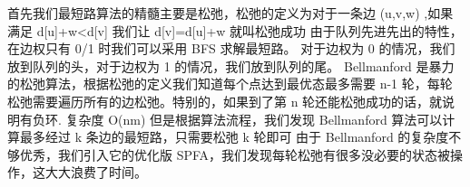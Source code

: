 {}\markdownRendererInterblockSeparator
{}
\markdownRendererSectionEnd \markdownRendererSectionBegin
{}\markdownRendererInterblockSeparator
{}\markdownRendererSectionBegin
{}\markdownRendererInterblockSeparator
{}首先我们最短路算法的精髓主要是松弛，松弛的定义为对于一条边\markdownRendererDollarSign{} (u,v,w) \markdownRendererDollarSign{},如果满足\markdownRendererDollarSign{} d[u]+w<d[v] \markdownRendererDollarSign{}\markdownRendererParagraphSeparator
{}我们让\markdownRendererDollarSign{} d[v]=d[u]+w \markdownRendererDollarSign{}就叫松弛成功\markdownRendererInterblockSeparator
{}\markdownRendererSectionBegin
{}\markdownRendererInterblockSeparator
{}由于队列先进先出的特性，在边权只有\markdownRendererDollarSign{} 0/1 \markdownRendererDollarSign{}时我们可以采用\markdownRendererDollarSign{} BFS \markdownRendererDollarSign{}求解最短路。\markdownRendererParagraphSeparator
{}对于边权为\markdownRendererDollarSign{} 0 \markdownRendererDollarSign{}的情况，我们放到队列的头，对于边权为\markdownRendererDollarSign{} 1 \markdownRendererDollarSign{}的情况，我们放到队列的尾。\markdownRendererInterblockSeparator
{}
\markdownRendererSectionEnd \markdownRendererSectionBegin
{}\markdownRendererInterblockSeparator
{}\markdownRendererDollarSign{} Bellmanford \markdownRendererDollarSign{}是暴力的松弛算法，根据松弛的定义我们知道每个点达到最优态最多需要\markdownRendererDollarSign{} n-1 \markdownRendererDollarSign{}轮，每轮松弛需要遍历所有的边松弛。特别的，如果到了第\markdownRendererDollarSign{} n \markdownRendererDollarSign{}轮还能松弛成功的话，就说明有负环.\markdownRendererParagraphSeparator
{}复杂度\markdownRendererDollarSign{} O(nm) \markdownRendererDollarSign{}\markdownRendererParagraphSeparator
{}但是根据算法流程，我们发现\markdownRendererDollarSign{} Bellmanford \markdownRendererDollarSign{}算法可以计算最多经过\markdownRendererDollarSign{} k \markdownRendererDollarSign{}条边的最短路，只需要松弛\markdownRendererDollarSign{} k \markdownRendererDollarSign{}轮即可\markdownRendererInterblockSeparator
{}\markdownRendererInterblockSeparator
{}
\markdownRendererSectionEnd \markdownRendererSectionBegin
{}\markdownRendererInterblockSeparator
{}由于 \markdownRendererDollarSign{}Bellmanford\markdownRendererDollarSign{} 的复杂度不够优秀，我们引入它的优化版 \markdownRendererDollarSign{}SPFA\markdownRendererDollarSign{}，我们发现每轮松弛有很多没必要的状态被操作，这大大浪费了时间。\markdownRendererParagraphSeparator
